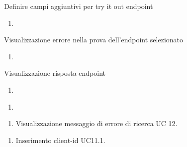 \begin{usecase}{8.2}{Definire campi aggiuntivi per try it out endpoint}\label{uc:}
    \usecasepre{}
    \usecasedesc{}
    \usecasepost{}

    \usecasemain{}
        \begin{enumerate}
            \item 
        \end{enumerate}

\end{usecase}

\begin{usecase}{9}{Visualizzazione errore nella prova dell'endpoint selezionato}\label{uc:visualizzazione-errore-nella-prova-dell-endpoint-selezionato}
    \usecasepre{}
    \usecasedesc{}
    \usecasepost{}

    \usecasemain{}
        \begin{enumerate}
            \item 
        \end{enumerate}

\end{usecase}


\begin{usecase}{10}{Visualizzazione risposta endpoint}\label{uc:}
    \usecasepre{}
    \usecasedesc{}
    \usecasepost{}

    \usecasemain{}
        \begin{enumerate}
            \item 
        \end{enumerate}

\end{usecase}


\begin{usecase}{}{}\label{uc:}
    \usecasepre{}
    \usecasedesc{}
    \usecasepost{}

    \usecasemain{}
        \begin{enumerate}
            \item 
        \end{enumerate}

    \usecaseext{}
        \begin{enumerate}
            \item Visualizzazione messaggio di errore di ricerca UC 12.
        \end{enumerate}

    \usecasegen{}
        \begin{enumerate}
            \item Inserimento client-id UC11.1.
        \end{enumerate}

\end{usecase}


